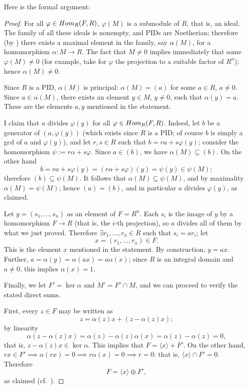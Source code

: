 Here is the formal argument:
\begin{proof}
  For all $\varphi \in Hom_R(F,R)$, $\varphi(M)$ is a submodule of
  $R$, that is, an ideal. The family of all these ideals is nonempty,
  and PIDs are Noetherian; therefore (by ) there
  exists a maximal element in the family, say $\alpha(M)$, for a
  homomorphism $\alpha : M \to R$. The fact that $M \neq 0$ implies
  immediately that some $\varphi(M) \neq 0$ (for example, take for
  $\varphi$ the projection to a suitable factor of $R^n$); hence
  $\alpha(M) \neq 0$.

  Since $R$ is a PID, $\alpha(M)$ is principal: $\alpha(M) = (a)$ for
  some $a \in R$, $a \neq 0$. Since $a \in \alpha(M)$, there exists an
  element $y \in M$, $y \neq 0$, such that $\alpha(y) = a$. These are
  the elements $a, y$ mentioned in the statement.

  I claim that $a$ divides $\varphi(y)$ for all
  $\varphi \in Hom_R(F,R)$.  Indeed, let $b$ be a generator of
  $(a, \varphi(y))$ (which exists since $R$ is a PID; of course $b$ is
  simply a gcd of $a$ and $\varphi(y)$), and let $r, s \in R$ such
  that $b = ra + s\varphi(y)$; consider the homomorphism
  $\psi := r\alpha + s\varphi$. Since $a \in (b)$, we have
  $\alpha(M) \subseteq (b)$. On the other hand
  \[
    b = ra + s\varphi(y) = (r\alpha + s\varphi)(y) = \psi(y) \in
    \psi(M);
  \]
  therefore $(b) \subseteq \psi(M)$. It follows that
  $\alpha(M) \subseteq \psi(M)$, and by maximality
  $\alpha(M) = \psi(M)$; hence $(a) = (b)$, and in particular $a$
  divides $\varphi(y)$, as claimed.

  Let $y = (s_1, \dots, s_n)$ as an element of $F = R^n$. Each $s_i$
  is the image of $y$ by a homomorphism $F \to R$ (that is, the $i$-th
  projection), so $a$ divides all of them by what we just proved.
  Therefore $\exists r_1, \dots, r_n \in R$ such that $s_i = ar_i$;
  let
  \[
    x = (r_1, \dots, r_n) \in F.
  \]
  This is the element $x$ mentioned in the statement. By construction,
  $y = ax$. Further, $a = \alpha(y) = \alpha(ax) = a\alpha(x)$; since
  $R$ is an integral domain and $a \neq 0$, this implies
  $\alpha(x) = 1$.

  Finally, we let $F' = \ker\alpha$ and $M' = F' \cap M$, and we can
  proceed to verify the stated direct sums.

  First, every $z \in F$ may be written as
  \[
    z = \alpha(z)x + (z - \alpha(z)x);
  \]
  by linearity
  \[
    \alpha(z - \alpha(z)x) = \alpha(z) - \alpha(z)\alpha(x) =
    \alpha(z) - \alpha(z) = 0,
  \]
  that is, $z - \alpha(z)x \in \ker\alpha$. This implies that
  $F = \langle x \rangle + F'$. On the other hand,
  $rx \in F' \implies \alpha(rx) = 0 \implies r\alpha(x) = 0 \implies
  r = 0$: that is, $\langle x \rangle \cap F' = 0$. Therefore
  \[
    F = \langle x \rangle \oplus F',
  \]
  as claimed (cf.\
  ).


\end{proof}
